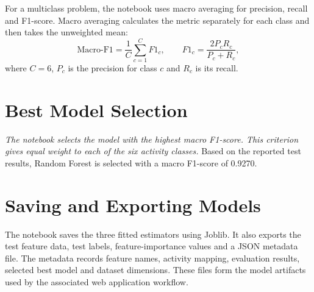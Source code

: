 For a multiclass problem, the notebook uses macro averaging for precision, recall and F1-score. Macro averaging calculates the metric separately for each class and then takes the unweighted mean:
\[
\text{Macro-F1} = \frac{1}{C}\sum_{c=1}^{C}F1_c,
\qquad
F1_c = \frac{2P_cR_c}{P_c+R_c},
\]
where $C=6$, $P_c$ is the precision for class $c$ and $R_c$ is its recall.

\section{Best Model Selection}
\emph{The notebook selects the model with the highest macro F1-score. This criterion gives equal weight to each of the six activity classes.} Based on the reported test results, Random Forest is selected with a macro F1-score of 0.9270.

\section{Saving and Exporting Models}
The notebook saves the three fitted estimators using Joblib. It also exports the test feature data, test labels, feature-importance values and a JSON metadata file. The metadata records feature names, activity mapping, evaluation results, selected best model and dataset dimensions. These files form the model artifacts used by the associated web application workflow.
